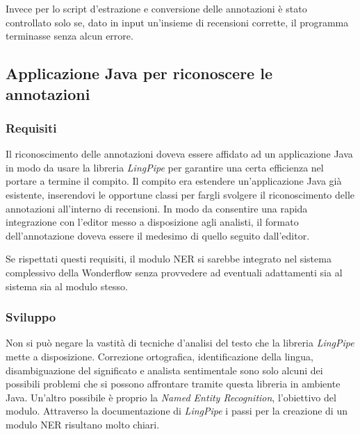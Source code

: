 Invece per lo \gls{script} d'estrazione e conversione delle annotazioni è stato
controllato solo se, dato in input un'insieme di recensioni corrette, il
programma terminasse senza alcun errore.

\subsection{Applicazione Java per riconoscere le annotazioni}
\subsubsection{Requisiti}
Il riconoscimento delle annotazioni doveva essere affidato ad un applicazione
Java in modo da usare la libreria \textit{LingPipe} per garantire una certa
efficienza nel portare a termine il compito. Il compito era estendere
un'applicazione Java già esistente, inserendovi le opportune classi per fargli
svolgere il riconoscimento delle annotazioni all'interno di recensioni. In modo
da consentire una rapida integrazione con l'editor messo a disposizione agli
analisti, il formato dell'annotazione doveva essere il medesimo di quello
seguito dall'editor.

Se rispettati questi requisiti, il modulo \gls{NER} si sarebbe integrato nel
sistema complessivo della Wonderflow senza provvedere ad eventuali adattamenti
sia al sistema sia al modulo stesso.

\subsubsection{Sviluppo}
Non si può negare la vastità di tecniche d'analisi del testo che la libreria
\textit{LingPipe} mette a disposizione. Correzione ortografica, identificazione
della lingua, disambiguazione del significato e analista sentimentale sono solo
alcuni dei possibili problemi che si possono affrontare tramite questa libreria
in ambiente Java. Un'altro possibile è proprio la
\textit{Named Entity Recognition}, l'obiettivo del modulo. Attraverso la
documentazione di \textit{LingPipe} i passi per la creazione di un modulo
\gls{NER} risultano molto chiari.

